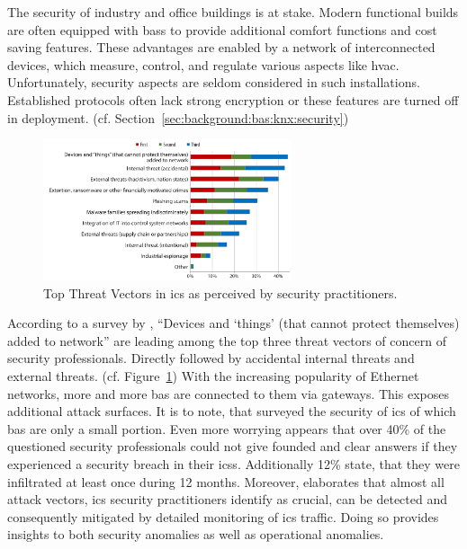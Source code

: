 
The security of industry and office buildings is at stake.
Modern functional builds are often equipped with \glspl{bas} to provide additional comfort functions and cost saving features.
These advantages are enabled by a network of interconnected devices, which measure, control, and regulate various aspects like \gls{hvac}.
Unfortunately, security aspects are seldom considered in such installations. \parencite{Brandstetter2017}
Established protocols often lack strong encryption or these features are turned off in deployment. (cf. Section~\ref{sec:background:bas:knx:security})

\begin{figure}
	\centering
	\vspace{-18pt}
	\includegraphics[width=0.65\textwidth,keepaspectratio]{figures/000-gregory-brown2017-threats.png}
	\caption[Top Threat Vectors in ICS]{Top Threat Vectors in \acs{ics} as perceived by security practitioners. \parencite[p.~9]{Gregory-Brown2017}}
	\label{fig:intro:threats}
	\vspace{-10pt}
\end{figure}

According to a survey by \textcite[p.~9]{Gregory-Brown2017}, \enquote{Devices and \enquote{things} (that cannot protect themselves) added to network} are leading among the top three threat vectors of concern of security professionals. Directly followed by accidental internal threats and external threats. (cf. Figure~\ref{fig:intro:threats})
With the increasing popularity of Ethernet networks, more and more \gls{bas} are connected to them via gateways. This exposes additional attack surfaces.
It is to note, that \textcite{Gregory-Brown2017} surveyed the security of \gls{ics} of which \gls{bas} are only a small portion.
Even more worrying appears that over 40\% of the questioned security professionals could not give founded and clear answers if they experienced a security breach in their \glspl{ics}. Additionally 12\% state, that they were infiltrated at least once during 12 months. \parencite[p.~13]{Gregory-Brown2017}
Moreover, \textcite{Gregory-Brown2017} elaborates that almost all attack vectors, \gls{ics} security practitioners identify as crucial, can be detected and consequently mitigated by detailed monitoring of \gls{ics} traffic. Doing so provides insights to both security anomalies as well as operational anomalies. 

